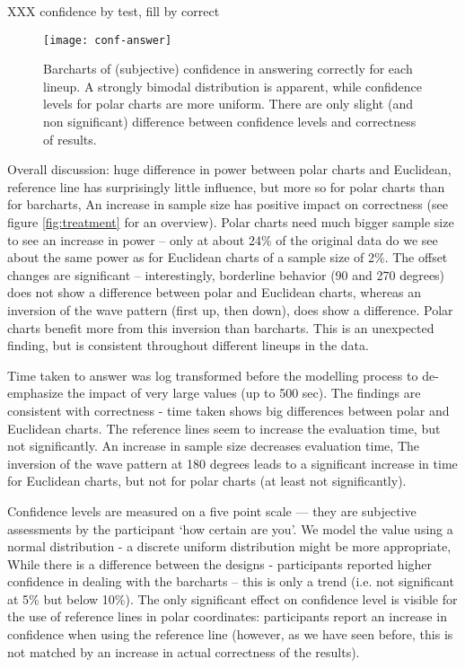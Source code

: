XXX confidence by test, fill by correct
\begin{figure}[htbp] %
   \centering
   \texttt{[image: conf-answer]} 
   \caption{Barcharts of (subjective) confidence in answering correctly for each lineup. A strongly bimodal distribution is apparent, while confidence levels for polar charts are more uniform. There are only slight (and non significant) difference between confidence levels and correctness of results.}
   \label{fig:time}
\end{figure}

Overall discussion: huge difference in power between polar charts and Euclidean, reference line has surprisingly little influence, but more so for polar charts than for barcharts,
An increase in sample size has positive impact on correctness (see figure \ref{fig:treatment} for an overview). Polar charts need much bigger sample size to see an increase in power -- only at about 24\% of the original data do we see about the same power as for Euclidean charts of a sample size of 2\%.
The offset changes are significant -- interestingly, borderline behavior (90 and 270 degrees) does not show a difference between polar and Euclidean charts, whereas an inversion of the wave pattern (first up, then down), does show a difference. Polar charts benefit more from this inversion than barcharts. This is an unexpected finding, but is consistent throughout different lineups in the data.

Time taken to answer was log transformed before the modelling process to de-emphasize the impact of very large values (up to 500 sec). The findings are consistent with correctness - time taken shows big differences between polar and Euclidean charts. The reference lines seem to increase the evaluation time, but not significantly. An increase in sample size decreases evaluation time, The inversion of the wave pattern at 180 degrees leads to a significant increase in time for Euclidean charts, but not for polar charts (at least not significantly). 

 Confidence levels are measured on a five point scale --- they are subjective assessments by the participant `how certain are you'. We model the value using a normal distribution - a discrete uniform distribution  might be more appropriate,
While there is a difference between the designs - participants reported higher confidence in dealing with the barcharts -- this is only  a trend (i.e. not significant at 5\% but below 10\%). The only significant effect on confidence level is visible for the use of reference lines in polar coordinates: participants report an increase in confidence when using the reference line (however, as we have seen before, this is not matched by an increase in actual correctness of the results).

